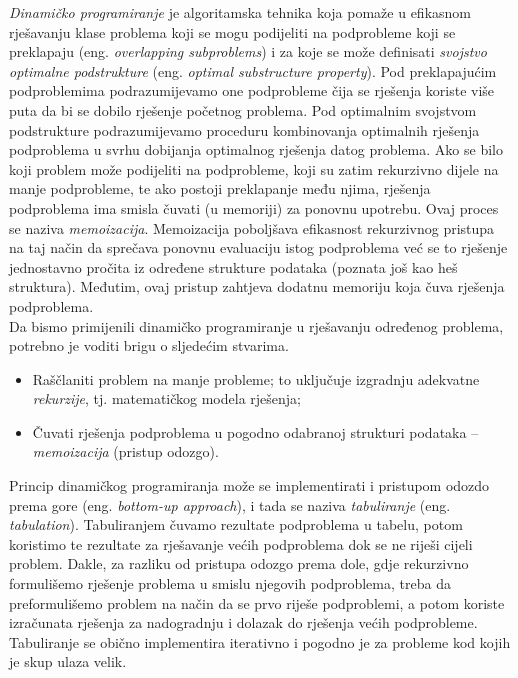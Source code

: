 \textit{Dinamičko programiranje} je algoritamska tehnika koja pomaže u efika\-snom rješavanju klase problema koji se mogu podijeliti na podprobleme koji se preklapaju (eng. \textit{overlapping subproblems}) i za koje se može definisati \emph{svojstvo optimalne podstrukture} (eng. \textit{optimal substructure property}). Pod preklapaju\-ćim podproblemima podrazumijevamo 
one podprobleme čija se rješenja kori\-ste vi\-še puta da bi se dobilo rješenje početnog problema. Pod optimalnim svojstvom podstrukture   podrazu\-mijevamo proceduru kombino\-vanja optima\-lnih rješe\-nja podproblema u svrhu dobijanja  optimalnog  rješenja datog proble\-ma.   Ako se bilo koji problem može podijeliti na podprobleme, koji su zatim rekurzivno dijele na manje podprobleme, te ako postoji prekla\-panje među   njima, rješenja podproblema ima smisla  čuvati (u memoriji) za ponovnu upo\-trebu. Ovaj proces se naziva \textit{memoizacija}. Memoizacija poboljšava efikasnost rekurzivnog pristupa na taj način da sprečava ponovnu evaluaciju istog podproblema već se to rješenje  jednostavno pročita iz odre\-đene strukture podataka (poznata još kao heš struktura).   Međutim, ovaj pristup zahtjeva dodatnu memoriju  koja čuva rješenja podproblema. \\  

Da bismo primijenili dinamičko programiranje u rješavanju određenog problema, potrebno je voditi brigu o sljedećim stvarima.
\begin{itemize}
	\item Raščlaniti problem na manje probleme; to uključuje izgradnju adekvatne \textit{rekurzije}, tj. matematičkog modela rješenja; 
	\item Čuvati rješenja podproblema u pogodno odabranoj strukturi podataka -- \textit{memoizacija} (pristup odozgo).
\end{itemize}
Princip dinamičkog programiranja može se implementirati i pristupom odo\-zdo prema gore (eng. \textit{bottom-up approach}), i tada se naziva \textit{tabuliranje} (eng. \textit{tabulation}). Tabuliranjem čuvamo rezultate podproblema u tabelu, potom koristimo te rezultate za rješavanje većih podproblema dok se ne riješi cijeli problem. Dakle, za razliku od pristupa odozgo prema dole, gdje  rekurzivno formulišemo rješenje problema  u smislu njegovih podproblema,  treba da  preformulišemo problem na način da se prvo riješe podproblemi, a potom koriste izračunata rješenja za nadogradnju i dolazak do rješenja većih podpro\-bleme. Tabuliranje se obično implementira iterativno i pogodno je za probleme kod kojih je skup ulaza velik.

